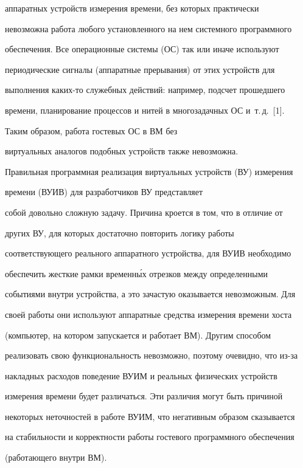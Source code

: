 аппаратных устройств измерения времени, без которых практически 


невозможна работа любого установленного на нем системного программного 


обеспечения. Все операционные системы (ОС) так или иначе используют 


периодические сигналы (аппаратные прерывания) от этих устройств для 


выполнения каких-то служебных действий: например, подсчет прошедшего 


времени, планирование процессов и нитей в многозадачных ОС и~т.\,д.~[1]. 


Таким образом, работа гостевых ОС в ВМ без 


виртуальных аналогов подобных устройств также невозможна.


     


     Правильная программная реализация виртуальных устройств (ВУ) измерения 


времени (ВУИВ) для разработчиков ВУ представляет 


собой довольно сложную задачу. Причина кроется в том, что в отличие от 


других ВУ, для которых достаточно повторить логику работы 


соответствующего реального аппаратного устройства, для ВУИВ необходимо 


обеспечить жесткие рамки временн\'{ы}х отрезков между определенными 


событиями внутри устройства, а это зачастую оказывается невозможным. Для 


своей работы они используют аппаратные средства измерения времени хоста 


(компьютер, на котором запускается и работает ВМ). Другим способом 


реализовать свою функциональность невозможно, поэтому очевидно, что из-за 


накладных расходов поведение ВУИМ и реальных физических устройств 


измерения времени будет различаться. Эти различия могут быть причиной 


некоторых неточностей в работе ВУИМ, что негативным образом сказывается 


на стабильности и корректности работы гостевого программного обеспечения 


(работающего внутри ВМ).


